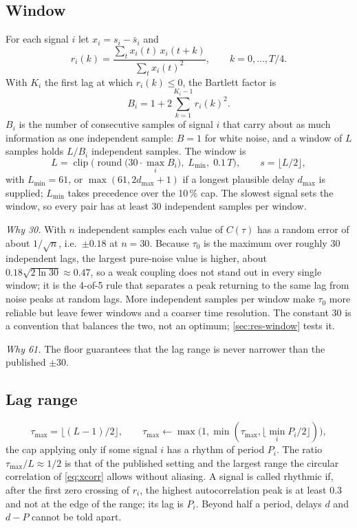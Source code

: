 \documentclass[11pt,a4paper]{article}
\newcommand{\tmax}{\tau_{\max}}
\begin{document}
\subsection{Window}
\label{sec:window}
For each signal $i$ let $x_i = s_i - \bar s_i$ and
\begin{equation}
r_i(k) = \frac{\sum_t x_i(t)\, x_i(t+k)}{\sum_t x_i(t)^2}, \qquad k = 0, \dots, T/4 .
\end{equation}
With $K_i$ the first lag at which $r_i(k) \le 0$, the Bartlett factor is
\begin{equation}
B_i = 1 + 2 \sum_{k=1}^{K_i - 1} r_i(k)^2 .
\label{eq:bartlett}
\end{equation}
$B_i$ is the number of consecutive samples of signal $i$ that carry about as much information as one independent sample: $B = 1$ for white noise, and a window of $L$ samples holds $L / B_i$ independent samples. The window is
\begin{equation}
L = \operatorname{clip}\!\Big(\operatorname{round}\big(30 \cdot \max_i B_i\big),\; L_{\min},\; 0.1\,T\Big), \qquad s = \lfloor L/2 \rfloor ,
\label{eq:window}
\end{equation}
with $L_{\min} = 61$, or $\max(61, 2 d_{\max} + 1)$ if a longest plausible delay $d_{\max}$ is supplied; $L_{\min}$ takes precedence over the 10\,\% cap. The slowest signal sets the window, so every pair has at least 30 independent samples per window.

\emph{Why 30.} With $n$ independent samples each value of $C(\tau)$ has a random error of about $1/\sqrt{n}$, i.e.\ $\pm0.18$ at $n = 30$. Because $\tau_0$ is the maximum over roughly 30 independent lags, the largest pure-noise value is higher, about $0.18\sqrt{2\ln 30} \approx 0.47$, so a weak coupling does not stand out in every single window; it is the 4-of-5 rule that separates a peak returning to the same lag from noise peaks at random lags. More independent samples per window make $\tau_0$ more reliable but leave fewer windows and a coarser time resolution. The constant 30 is a convention that balances the two, not an optimum; \cref{sec:res-window} tests it.

\emph{Why 61.} The floor guarantees that the lag range is never narrower than the published $\pm30$.

\subsection{Lag range}
\label{sec:lag}
\begin{equation}
\tmax = \big\lfloor (L-1)/2 \big\rfloor, \qquad \tmax \leftarrow \max\!\big(1, \min(\tmax, \lfloor \min_i P_i / 2 \rfloor)\big),
\end{equation}
the cap applying only if some signal $i$ has a rhythm of period $P_i$.
The ratio $\tmax / L \approx 1/2$ is that of the published setting and the largest range the circular correlation of \cref{eq:xcorr} allows without aliasing. A signal is called rhythmic if, after the first zero crossing of $r_i$, the highest autocorrelation peak is at least 0.3 and not at the edge of the range; its lag is $P_i$. Beyond half a period, delays $d$ and $d - P$ cannot be told apart.
\end{document}
